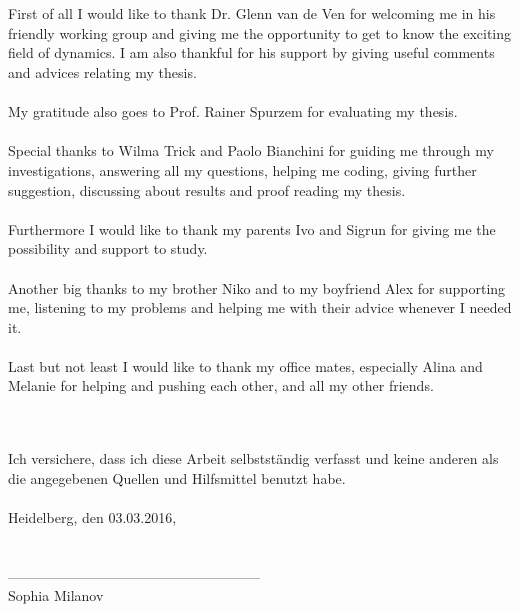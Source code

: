 \\
\\First of all I would like to thank Dr. Glenn van de Ven for welcoming me in his friendly working group and giving me the opportunity to get to know the exciting field of dynamics. I am also thankful for his support by giving useful comments and advices relating my thesis.\\
\\
My gratitude also goes to Prof. Rainer Spurzem for evaluating my thesis.\\
\\
Special thanks to Wilma Trick and Paolo Bianchini for guiding me through my investigations, answering all my questions, helping me coding, giving further suggestion, discussing about results and proof reading my thesis.\\
\\
Furthermore I would like to thank my parents Ivo and Sigrun for giving me the possibility and support to study.  \\
\\
Another big thanks to my brother Niko and to my boyfriend Alex for supporting me, listening to my problems and helping me with their advice whenever I needed it. \\
\\
Last but not least I would like to thank my office mates, especially Alina and Melanie for helping and pushing each other, and all my other friends.


\newpage
{}\\
\\
Ich versichere, dass ich diese Arbeit selbstst\"{a}ndig verfasst und keine anderen als die angegebenen Quellen und Hilfsmittel benutzt habe.
\\ \\
Heidelberg, den 03.03.2016,\\
\\
\\
------------------------------------------------------ \\
{\footnotesize Sophia Milanov}